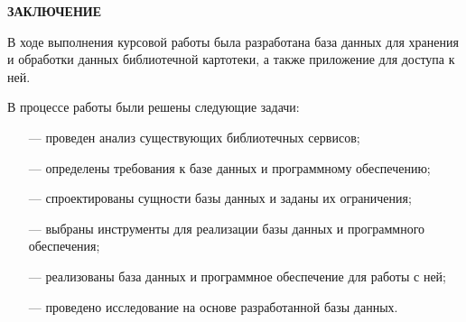 \begin{center}
    \textbf{ЗАКЛЮЧЕНИЕ}
\end{center}

В ходе выполнения курсовой работы была разработана база данных для хранения и обработки данных библиотечной картотеки, а также приложение для доступа к ней.

В процессе работы были решены следующие задачи:

\begin{itemize}
	\item[---] проведен анализ существующих библиотечных сервисов;
	\item[---] определены требования к базе данных и программному обеспечению;
	\item[---] спроектированы сущности базы данных и заданы их ограничения;  
	\item[---] выбраны инструменты для реализации базы данных и программного обеспечения;  
	\item[---] реализованы база данных и программное обеспечение для работы с ней;  
	\item[---] проведено исследование на основе разработанной базы данных.
\end{itemize}
